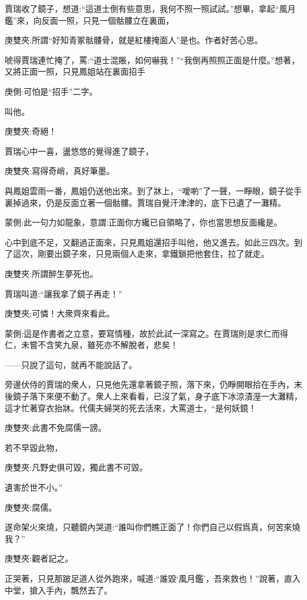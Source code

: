 \begin{parag}
    賈瑞收了鏡子，想道:“這道士倒有些意思，我何不照一照試試。”想畢，拿起“風月鑑”來，向反面一照，只見一個骷髏立在裏面，\begin{note}庚雙夾:所謂“好知青冢骷髏骨，就是紅樓掩面人”是也。作者好苦心思。\end{note}唬得賈瑞連忙掩了，罵:“道士混賬，如何嚇我！”“我倒再照照正面是什麼。”想著，又將正面一照，只見鳳姐站在裏面招手\begin{note}庚側:可怕是“招手”二字。\end{note}叫他。\begin{note}庚雙夾:奇絕！\end{note}賈瑞心中一喜，盪悠悠的覺得進了鏡子，\begin{note}庚雙夾:寫得奇峭，真好筆墨。\end{note}與鳳姐雲雨一番，鳳姐仍送他出來。到了牀上，“噯喲”了一聲，一睜眼，鏡子從手裏掉過來，仍是反面立著一個骷髏。賈瑞自覺汗津津的，底下已遺了一灘精。\begin{note}蒙側:此一句力如龍象，意謂:正面你方纔已自領略了，你也當思想反面纔是。\end{note}心中到底不足，又翻過正面來，只見鳳姐還招手叫他，他又進去。如此三四次。到了這次，剛要出鏡子來，只見兩個人走來，拿鐵鎖把他套住，拉了就走。\begin{note}庚雙夾:所謂醉生夢死也。\end{note}賈瑞叫道:“讓我拿了鏡子再走！”\begin{note}庚雙夾:可憐！大衆齊來看此。\end{note}\begin{note}蒙側:這是作書者之立意，要寫情種，故於此試一深寫之。在賈瑞則是求仁而得仁，未嘗不含笑九泉，雖死亦不解脫者，悲矣！\end{note}——只說了這句，就再不能說話了。
\end{parag}


\begin{parag}
    旁邊伏侍的賈瑞的衆人，只見他先還拿著鏡子照，落下來，仍睜開眼拾在手內，末後鏡子落下來便不動了。衆人上來看看，已沒了氣，身子底下冰涼漬溼一大灘精，這才忙著穿衣抬牀。代儒夫婦哭的死去活來，大罵道士，“是何妖鏡！\begin{note}庚雙夾:此書不免腐儒一謗。\end{note}若不早毀此物，\begin{note}庚雙夾:凡野史俱可毀，獨此書不可毀。\end{note}遺害於世不小。”\begin{note}庚雙夾:腐儒。\end{note}遂命架火來燒，只聽鏡內哭道:“誰叫你們瞧正面了！你們自己以假爲真，何苦來燒我？”\begin{note}庚雙夾:觀者記之。\end{note}正哭著，只見那跛足道人從外跑來，喊道:“誰毀‘風月鑑’，吾來救也！”說著，直入中堂，搶入手內，飄然去了。
\end{parag}


